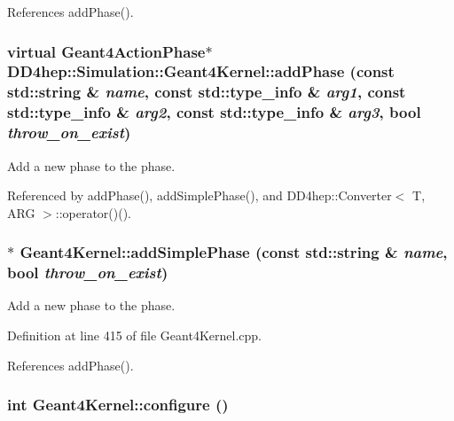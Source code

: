 References addPhase().\hypertarget{class_d_d4hep_1_1_simulation_1_1_geant4_kernel_a7b04d88f6257e121268032dfe2bdc2d4}{
\subsubsection[{addPhase}]{\setlength{\rightskip}{0pt plus 5cm}virtual {\bf Geant4ActionPhase}$\ast$ DD4hep::Simulation::Geant4Kernel::addPhase (const std::string \& {\em name}, \/  const std::type\_\-info \& {\em arg1}, \/  const std::type\_\-info \& {\em arg2}, \/  const std::type\_\-info \& {\em arg3}, \/  bool {\em throw\_\-on\_\-exist})}}
\label{class_d_d4hep_1_1_simulation_1_1_geant4_kernel_a7b04d88f6257e121268032dfe2bdc2d4}


Add a new phase to the phase. 

Referenced by addPhase(), addSimplePhase(), and DD4hep::Converter$<$ T, ARG $>$::operator()().\hypertarget{class_d_d4hep_1_1_simulation_1_1_geant4_kernel_ad6e24016ebe31a06417ffac7f6e93818}{
\subsubsection[{addSimplePhase}]{ $\ast$ Geant4Kernel::addSimplePhase (const std::string \& {\em name}, \/  bool {\em throw\_\-on\_\-exist})}}
\label{class_d_d4hep_1_1_simulation_1_1_geant4_kernel_ad6e24016ebe31a06417ffac7f6e93818}


Add a new phase to the phase. 

Definition at line 415 of file Geant4Kernel.cpp.

References addPhase().\hypertarget{class_d_d4hep_1_1_simulation_1_1_geant4_kernel_ae48b44218f1a8115d8c7c105db17c43f}{
\subsubsection[{configure}]{\setlength{\rightskip}{0pt plus 5cm}int Geant4Kernel::configure ()}}
\label{class_d_d4hep_1_1_simulation_1_1_geant4_kernel_ae48b44218f1a8115d8c7c105db17c43f}


